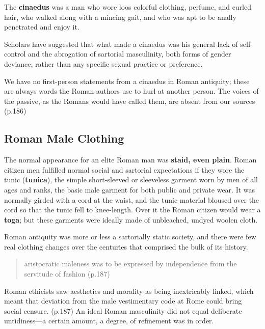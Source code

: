 \begin{defn}
    The \textbf{cinaedus} was a man who wore loos colorful clothing, perfume, and curled hair, who walked along with a mincing gait, and who was apt to be anally penetrated and enjoy it.
\end{defn}

Scholars have suggested that what made a cinaedus was his general lack of self-control and the abrogation of sartorial masculinity, both forms of gender deviance, rather than any specific sexual practice or preference.

\begin{nte}
    We have no first-person statements from a cinaedus in Roman antiquity; these are always words the Roman authors use to hurl at another person. The voices of the passive, as the Romans would have called them, are absent from our sources (p.186)
\end{nte}


\subsection{Roman Male Clothing}

The normal appearance for an elite Roman man was \textbf{staid, even plain}. Roman citizen men fulfilled normal social and sartorial expectations if they wore the tunic (\textbf{tunica}), the simple short-sleeved or sleeveless garment worn by men of all ages and ranks, the basic male garment for both public and private wear. It was normally girded with a cord at the waist, and the tunic material bloused over the cord so that the tunic fell to knee-length. Over it the Roman citizen would wear a \textbf{toga}; but these garments were ideally made of unbleached, undyed woolen cloth.


\begin{nte}
    Roman antiquity was more or less a sartorially static society, and there were few real clothing changes over the centuries that comprised the bulk of its history.
\end{nte}

\begin{quotation}
    aristocratic maleness was to be expressed by independence from the servitude of fashion (p.187)
\end{quotation}

Roman ethicists saw aesthetics and morality as being inextricably linked, which meant that deviation from the male vestimentary code at Rome could bring social censure. (p.187) An ideal Roman masculinity did not equal deliberate untidiness---a certain amount, a degree, of refinement was in order.


